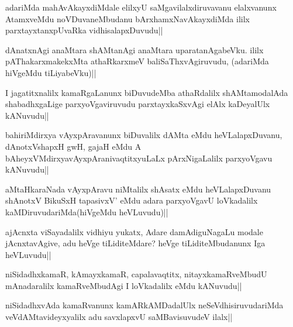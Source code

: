 \begin{artha}
adariMda mahAvAkayxdiMdale elilxyU saMgavilalxdiruvavanu elalxvanunx AtamxveMdu noVDuvaneMbudanu bArxhamxNavAkayxdiMda ililx parxtayxtanxpUvaRka vidhisalapxDuvudu||
\end{artha}

\begin{artha}
dAnatxnAgi anaMtara shAMtanAgi anaMtara uparatanAgabeVku. ililx pAThakarxmakekxMta athaRkarxmeV baliSaThxvAgiruvudu, (adariMda hiVgeMdu tiLiyabeVku)||
\end{artha}


\begin{artha}
I jagatitxnalilx kamaRgaLanunx biDuvudeMba athaRdalilx shAMtamodalAda shabadhxgaLige parxyoVgaviruvudu parxtayxkaSxvAgi elAlx kaDeyalUlx kANuvudu||
\end{artha}


\begin{artha}
bahiriMdirxya vAyxpAravanunx biDuvalilx dAMta eMdu heVLalapxDuvanu, dAnotxV\s shapxH gwH, gajaH eMdu A bAheyxVMdirxyavAyxpAranivaqtitxyuLaLx pArxNigaLalilx parxyoVgavu kANuvudu||
\end{artha}


\begin{artha}
aMtaHkaraNada vAyxpAravu niMtalilx shAsatx eMdu heVLalapxDuvanu shAnotxV BikuSxH tapasivxV' eMdu adara parxyoVgavU loVkadalilx kaMDiruvudariMda(hiVgeMdu heVLuvudu)||
\end{artha}


\begin{artha}
ajAcnxta viSayadalilx vidhiyu yukatx, Adare damAdiguNagaLu modale jAcnxtavAgive, adu heVge tiLiditeMdare? heVge tiLiditeMbudanunx Iga heVLuvudu||
\end{artha}

\begin{artha}
niSidadhxkamaR, kAmayxkamaR, capalavaqtitx, nitayxkamaRveMbudU mAnadaralilx kamaRveMbudAgi I loVkadalilx eMdu kANuvudu||
\end{artha}

\begin{artha}
niSidadhxvAda kamaRvanunx kamARkAMDadalUlx neSeVdhisiruvudariMda veVdAMtavideyxyalilx adu savxlapxvU saMBavisuvudeV ilalx||
\end{artha}


